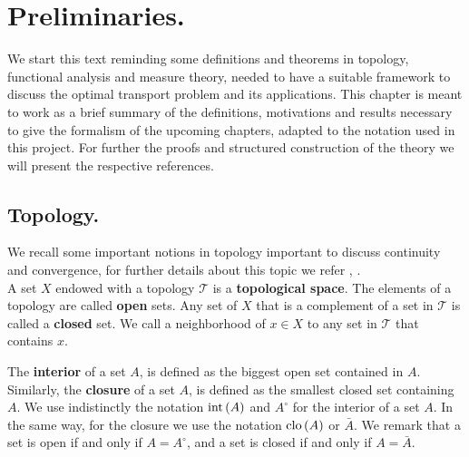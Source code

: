 \chapter{Preliminaries.}
We start this text reminding some definitions and theorems in topology, functional analysis and measure theory, needed to have a suitable framework to discuss the optimal transport problem and its applications. This chapter is meant to work as a brief summary of the definitions, motivations and results necessary to give the formalism of the upcoming chapters, adapted to the notation used in this project. For further the proofs and structured construction of the theory we will present the respective references.
 

\section{Topology.}
We recall some important notions in topology important to discuss continuity and convergence, for further details about this topic we refer \cite{munkres2000topology}, \cite{Morris1976DifferentialTopology}. 
\\

A set $X$ endowed with a topology $\mathcal{T}$ is a \textbf{topological space}. The elements of a topology are called \textbf{open} sets. Any set of $X$ that is a complement of a set in $\mathcal T$ is called a \textbf{closed} set. We call a neighborhood of $x\in X$ to any set in $\mathcal{T}$ that contains $x$.

The \textbf{interior} of a set $A$, is defined as the biggest open set contained in $A$. Similarly, the \textbf{closure} of a set $A$, is defined as the smallest closed set containing $A$. We use indistinctly the notation $\mathrm{int}\,(A)$ and $A^{\circ}$ for the interior of a set $A$. In the same way, for the closure we use the notation $\mathrm{clo}\,(A)$ or $\bar{A}$. We remark that a set is open if and only if $A=A^{\circ}$, and a set is closed if and only if $A=\bar{A}$.
\\


